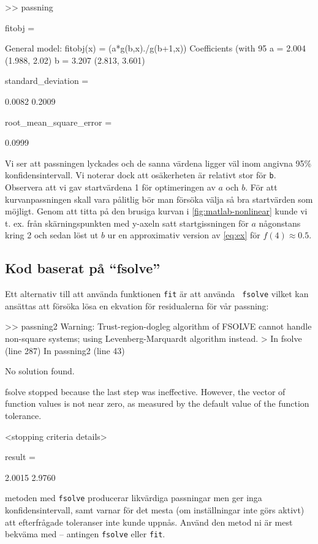 \begin{terminaloutput}
>> passning

fitobj = 

     General model:
     fitobj(x) = (a*g(b,x)./g(b+1,x))
     Coefficients (with 95%
       a =       2.004  (1.988, 2.02)
       b =       3.207  (2.813, 3.601)

standard_deviation =

    0.0082    0.2009


root_mean_square_error =

    0.0999
\end{terminaloutput}

Vi ser att passningen lyckades och de sanna värdena ligger väl inom
angivna 95\%  konfidensintervall. Vi noterar dock att osäkerheten är
relativt stor för {\tt b}. Observera att vi gav startvärdena 1 för
optimeringen av $a$ och $b$. För att kurvanpassningen skall vara pålitlig
bör man försöka välja så bra startvärden som möjligt. Genom att titta på
den brusiga kurvan i \cref{fig:matlab-nonlinear} kunde vi t. ex. från
skärningspunkten med y-axeln satt startgissningen för $a$ någonstans
kring 2 och sedan löst ut $b$ ur en approximativ version av \cref{eq:ex} för
$f(4) \approx 0.5$.

\subsection{Kod baserat på ``fsolve''}
\label{sec:matlab-fsolve}
Ett alternativ till att använda funktionen {\tt fit} är att använda {\tt
  fsolve} vilket kan ansättas att försöka lösa en ekvation för
residualerna för vår passning:


\begin{terminaloutput}
>> passning2
Warning: Trust-region-dogleg algorithm of FSOLVE cannot handle non-square systems; using Levenberg-Marquardt algorithm instead. 
> In fsolve (line 287)
  In passning2 (line 43) 

No solution found.

fsolve stopped because the last step was ineffective. However, the vector of function
values is not near zero, as measured by the default value of the function tolerance. 

<stopping criteria details>


result =

    2.0015    2.9760
\end{terminaloutput}

metoden med {\tt fsolve} producerar likvärdiga passningar men ger
inga konfidensintervall, samt varnar för det mesta (om inställningar inte
görs aktivt) att efterfrågade toleranser inte kunde uppnås. Använd den
metod ni är mest bekväma med -- antingen {\tt fsolve} eller {\tt fit}.

